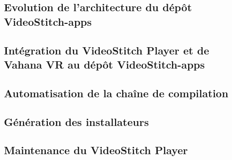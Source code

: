 \subsection{Evolution de l'architecture du dépôt VideoStitch-apps}

\subsection{Intégration du VideoStitch Player et de Vahana VR au dépôt VideoStitch-apps}

\subsection{Automatisation de la chaîne de compilation}

\subsection{Génération des installateurs}

\subsection{Maintenance du VideoStitch Player}
